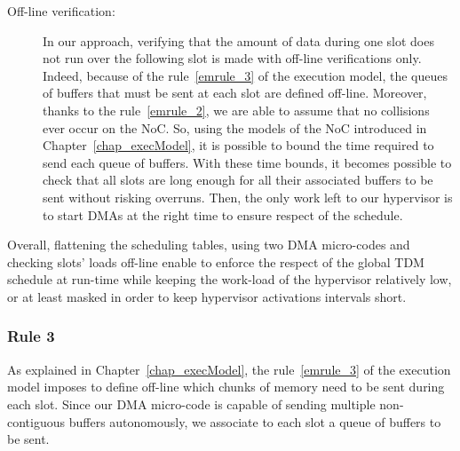 \documentclass[main.tex]{subfiles}
\begin{document}
\begin{description}
    \item[Off-line verification: ] In our approach, verifying that the amount
        of data during one \PC{} slot does not run over the following \PC{}
        slot is made with off-line verifications only. Indeed, because of the
        rule~\ref{emrule_3} of the execution model, the queues of buffers that
        must be sent at each \PC{} slot are defined off-line. Moreover, thanks
        to the rule~\ref{emrule_2}, we are able to assume that no collisions
        ever occur on the NoC. So, using the models of the NoC introduced in
        Chapter~\ref{chap_execModel}, it is possible to bound the time required
        to send each queue of buffers. With these time bounds, it becomes
        possible to check that all \PC{} slots are long enough for all their
        associated buffers to be sent without risking overruns. Then, the only
        work left to our hypervisor is to start DMAs at the right time to
        ensure respect of the schedule.

\end{description}

Overall, flattening the scheduling tables, using two DMA micro-codes and
checking \PC{} slots' loads off-line enable to enforce the respect of the
global TDM schedule at run-time while keeping the work-load of the hypervisor
relatively low, or at least masked in order to keep hypervisor activations
intervals short.


\subsubsection{Rule 3}
\label{sssec_implemExecModel_repectRule3}
As explained in Chapter~\ref{chap_execModel}, the rule~\ref{emrule_3} of the
execution model imposes to define off-line which chunks of memory need to be
sent during each \PC{} slot. Since our DMA micro-code is capable of sending
multiple non-contiguous buffers autonomously, we associate to each \PC{} slot a
queue of buffers to be sent.
\end{document}
